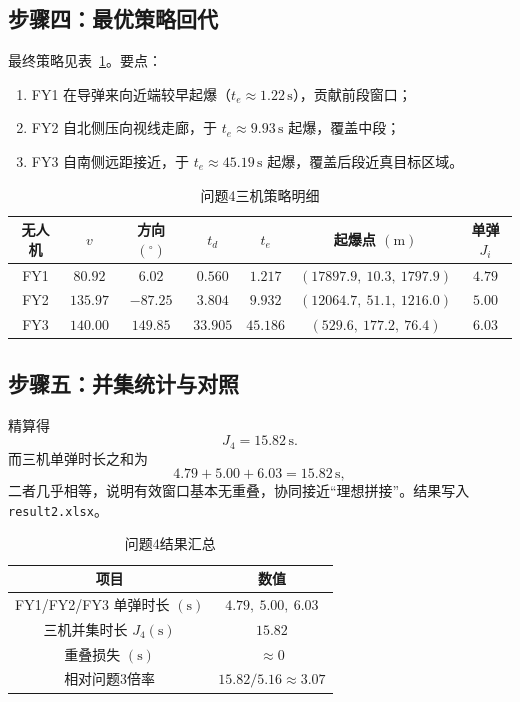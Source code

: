 \documentclass[withoutpreface,bwprint]{cumcmthesis}
\begin{document}
\subsection{步骤四：最优策略回代}
最终策略见表~\ref{tab:q4-detail}。要点：
\begin{enumerate}
  \item FY1 在导弹来向近端较早起爆（$t_e\approx 1.22\,\mathrm{s}$），贡献前段窗口；
  \item FY2 自北侧压向视线走廊，于 $t_e\approx 9.93\,\mathrm{s}$ 起爆，覆盖中段；
  \item FY3 自南侧远距接近，于 $t_e\approx 45.19\,\mathrm{s}$ 起爆，覆盖后段近真目标区域。
\end{enumerate}

\begin{table}[!htbp]
\centering
\caption{问题4三机策略明细}
\label{tab:q4-detail}
\begin{tabular}{ccccccc}
\toprule[1.5pt]
无人机 & $v$ & 方向$(^\circ)$ & $t_d$ & $t_e$ & 起爆点 $(\mathrm{m})$ & 单弹$J_i$ \\
\midrule[1pt]
FY1 & $80.92$ & $6.02$ & $0.560$ & $1.217$ & $(17897.9,\ 10.3,\ 1797.9)$ & $4.79$ \\
FY2 & $135.97$ & $-87.25$ & $3.804$ & $9.932$ & $(12064.7,\ 51.1,\ 1216.0)$ & $5.00$ \\
FY3 & $140.00$ & $149.85$ & $33.905$ & $45.186$ & $(529.6,\ 177.2,\ 76.4)$ & $6.03$ \\
\bottomrule[1.5pt]
\end{tabular}
\end{table}

\subsection{步骤五：并集统计与对照}
精算得
\begin{equation}
J_4=15.82\,\mathrm{s}.
\end{equation}
而三机单弹时长之和为
\[
4.79+5.00+6.03=15.82\,\mathrm{s},
\]
二者几乎相等，说明有效窗口基本无重叠，协同接近“理想拼接”。结果写入 \texttt{result2.xlsx}。

\begin{table}[!htbp]
\centering
\caption{问题4结果汇总}
\label{tab:q4}
\begin{tabular}{cc}
\toprule[1.5pt]
项目 & 数值 \\
\midrule[1pt]
FY1/FY2/FY3 单弹时长 $(\mathrm{s})$ & $4.79,\ 5.00,\ 6.03$ \\
三机并集时长 $J_4(\mathrm{s})$ & $15.82$ \\
重叠损失 $(\mathrm{s})$ & $\approx 0$ \\
相对问题3倍率 & $15.82/5.16\approx 3.07$ \\
\bottomrule[1.5pt]
\end{tabular}
\end{table}
\end{document}
